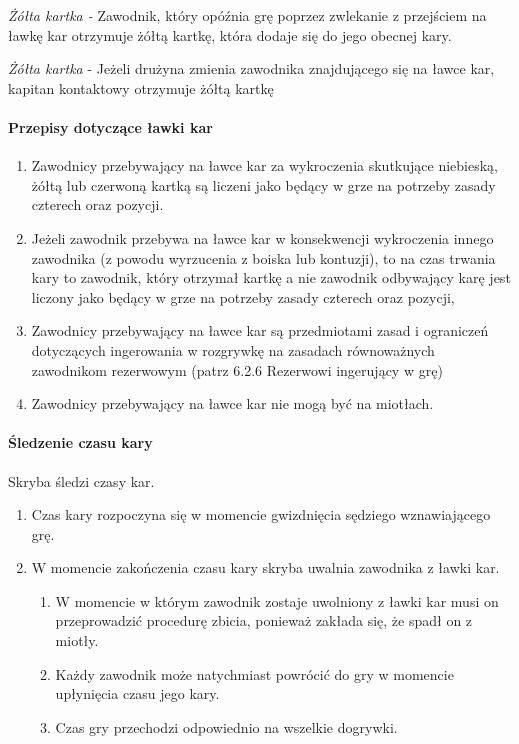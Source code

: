 \documentclass[12pt]{article}
\begin{document}
\emph{Żółta kartka -} Zawodnik, który opóźnia grę poprzez zwlekanie z
przejściem na ławkę kar otrzymuje żółtą kartkę, która dodaje się do jego
obecnej kary.

\emph{Żółta kartka} - Jeżeli drużyna zmienia zawodnika znajdującego się
na ławce kar, kapitan kontaktowy otrzymuje żółtą kartkę

\paragraph{Przepisy dotyczące ławki kar}

\begin{enumerate}
	\item
	      Zawodnicy przebywający na ławce kar za wykroczenia skutkujące
	      niebieską, żółtą lub czerwoną kartką są liczeni jako będący w grze na
	      potrzeby zasady czterech oraz pozycji.
	\item
	      Jeżeli zawodnik przebywa na ławce kar w konsekwencji wykroczenia
	      innego zawodnika (z powodu wyrzucenia z boiska lub kontuzji), to na
	      czas trwania kary to zawodnik, który otrzymał kartkę a nie zawodnik
	      odbywający karę jest liczony jako będący w grze na potrzeby zasady
	      czterech oraz pozycji,
	\item
	      Zawodnicy przebywający na ławce kar są przedmiotami zasad i ograniczeń
	      dotyczących ingerowania w rozgrywkę na zasadach równoważnych
	      zawodnikom rezerwowym (patrz 6.2.6 Rezerwowi ingerujący w grę)
	\item
	      Zawodnicy przebywający na ławce kar nie mogą być na miotłach.
\end{enumerate}

\paragraph{Śledzenie czasu kary}
Skryba śledzi czasy kar.

\begin{enumerate}
	\item
	      Czas kary rozpoczyna się w momencie gwizdnięcia sędziego wznawiającego
	      grę.
	\item
	      W momencie zakończenia czasu kary skryba uwalnia zawodnika z ławki
	      kar.

	      \begin{enumerate}
		      \item
		            W momencie w którym zawodnik zostaje uwolniony z ławki kar musi on
		            przeprowadzić procedurę zbicia, ponieważ zakłada się, że spadł on z
		            miotły.
		      \item
		            Każdy zawodnik może natychmiast powrócić do gry w momencie
		            upłynięcia czasu jego kary.
		      \item
		            Czas gry przechodzi odpowiednio na wszelkie dogrywki.
	      \end{enumerate}
\end{enumerate}
\end{document}

